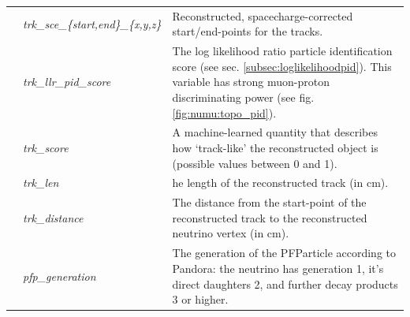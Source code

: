 \begin{table}[ht]
\begin{tabular}{ m{} | m{} | m{}  }
\multicolumn{1}{l|}{} & \emph{trk\_sce\_\{start,end\}\_\{x,y,z\}} &  Reconstructed, spacecharge-corrected start/end-points for the tracks.\\  \cline{2-3}
\multicolumn{1}{l|}{} & \emph{trk\_llr\_pid\_score} &  The log likelihood ratio particle identification score (see sec. \ref{subsec:loglikelihoodpid}). This variable has strong muon-proton discriminating power (see fig. \ref{fig:numu:topo_pid}).\\  \cline{2-3}
\multicolumn{1}{l|}{} & \emph{trk\_score} & A machine-learned quantity that describes how `track-like' the reconstructed object is (possible values between 0 and 1). \\  \cline{2-3}
\parbox[t]{2mm}{} & \emph{trk\_len} & he length of the reconstructed track (in cm). \\  
 & \emph{trk\_distance} & The distance from the start-point of the reconstructed track to the reconstructed neutrino vertex (in cm). \\  
 & \emph{pfp\_generation} &  The generation of the PFParticle according to Pandora: the neutrino has generation 1, it's direct daughters 2, and further decay products 3 or higher.\\  
\hline

\end{tabular}
\label{tab:numuvariableSummary}
\end{table}

